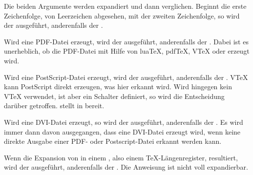 \begin{Declaration}
\end{Declaration}
Die
beiden Argumente  werden expandiert und dann
verglichen. Beginnt die erste Zeichenfolge, von Leerzeichen abgesehen, mit der
zweiten Zeichenfolge, so wird der  ausgeführt, anderenfalls
der .%
\iffalse%
\iftrue%
\ Von dieser Anweisung gibt es keine interne Variante.%
\else%
\ Es gibt keine interne Variante.%
\fi%
\fi%
\EndIndexGroup


\begin{Declaration}
\end{Declaration}
Wird eine PDF-Datei erzeugt, wird der
 ausgeführt, anderenfalls der . Dabei ist
es unerheblich, ob die PDF-Datei mit Hilfe von lua\TeX{}, pdf\TeX{}, V\TeX{}
oder \XeTeX{} erzeugt wird.%
\EndIndexGroup


\begin{Declaration}
\end{Declaration}
Wird eine PostScript-Datei erzeugt, wird
der  ausgeführt, anderenfalls der . V\TeX{}
kann PostScript direkt erzeugen, was hier erkannt wird. Wird hingegen kein
V\TeX{} verwendet, ist aber ein Schalter  definiert, so wird
die Entscheidung darüber getroffen. \KOMAScript{} stellt  in
\hyperref[cha:typearea]{}%
 bereit.%
\EndIndexGroup


\begin{Declaration}[0]
\end{Declaration}
Wird eine DVI-Datei erzeugt, so wird der
 ausgeführt, anderenfalls der . Es wird
immer dann davon \iffree{}{\pagebreak}%
ausgegangen, dass eine DVI-Datei erzeugt wird, wenn keine
direkte Ausgabe einer PDF- oder Postscript-Datei erkannt werden kann.%
\EndIndexGroup


\begin{Declaration}
\end{Declaration}
Wenn
die Expansion von  in einem , also einem
\TeX-Längenregister, resultiert, wird der  ausgeführt,
anderenfalls der . Die Anweisung ist nicht voll
expandierbar.%
\iffalse%
\iftrue%
\ Von dieser Anweisung gibt es keine interne Variante.%
\else%
\ Es gibt keine interne Variante.%
\fi%
\fi%
\EndIndexGroup


